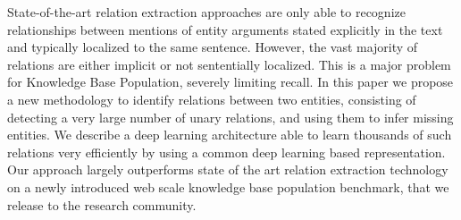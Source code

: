 State-of-the-art relation extraction approaches are only able to recognize relationships between mentions of entity arguments stated explicitly in the text and typically localized to  the same sentence. However, the vast majority of relations are either implicit or not sententially localized. This is a major problem for Knowledge Base Population, severely limiting recall. In this paper we propose a new methodology to identify relations between two entities, consisting of detecting a very large number of unary relations, and using them to infer missing entities. We describe a deep learning architecture able to learn thousands of such relations very efficiently by using a common deep learning based representation. Our approach largely outperforms state of the art relation extraction technology on a newly introduced web scale knowledge base population benchmark, that we release to the research community.
